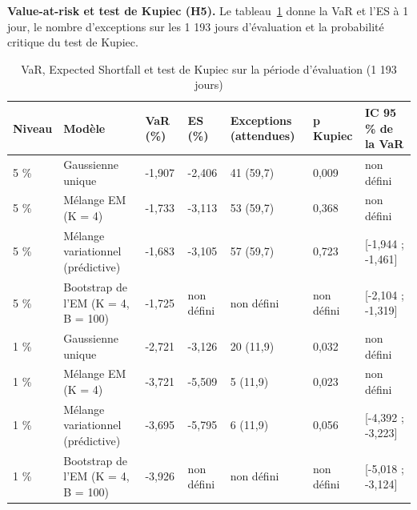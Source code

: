 \textbf{Value-at-risk et test de Kupiec (H5). }Le tableau~\ref{tab:3_cas_var} donne la VaR et l'ES à 1 jour, le nombre d'exceptions sur les 1 193 jours d'évaluation et la probabilité critique du test de Kupiec.

\begin{table}[H]
\centering
\small
\setlength{\tabcolsep}{0.07cm}
\begin{tabular}{|p{1.0cm}|p{4.2cm}|p{1.4cm}|p{1.4cm}|p{2.2cm}|p{1.5cm}|p{2.5cm}|}
\hline
\textbf{Niveau} & \textbf{Modèle} & \textbf{VaR (\%)} & \textbf{ES (\%)} & \textbf{Exceptions (attendues)} & \textbf{p Kupiec} & \textbf{IC 95 \% de la VaR} \\
\hline
5 \% & Gaussienne unique & -1,907 & -2,406 & 41 (59,7) & 0,009 & non défini \\
\hline
5 \% & Mélange EM (K = 4) & -1,733 & -3,113 & 53 (59,7) & 0,368 & non défini \\
\hline
5 \% & Mélange variationnel (prédictive) & -1,683 & -3,105 & 57 (59,7) & 0,723 & [-1,944 ; -1,461] \\
\hline
5 \% & Bootstrap de l'EM (K = 4, B = 100) & -1,725 & non défini & non défini & non défini & [-2,104 ; -1,319] \\
\hline
1 \% & Gaussienne unique & -2,721 & -3,126 & 20 (11,9) & 0,032 & non défini \\
\hline
1 \% & Mélange EM (K = 4) & -3,721 & -5,509 & 5 (11,9) & 0,023 & non défini \\
\hline
1 \% & Mélange variationnel (prédictive) & -3,695 & -5,795 & 6 (11,9) & 0,056 & [-4,392 ; -3,223] \\
\hline
1 \% & Bootstrap de l'EM (K = 4, B = 100) & -3,926 & non défini & non défini & non défini & [-5,018 ; -3,124] \\
\hline
\end{tabular}
\caption{VaR, Expected Shortfall et test de Kupiec sur la période d'évaluation (1 193 jours)}
\label{tab:3_cas_var}
\end{table}
